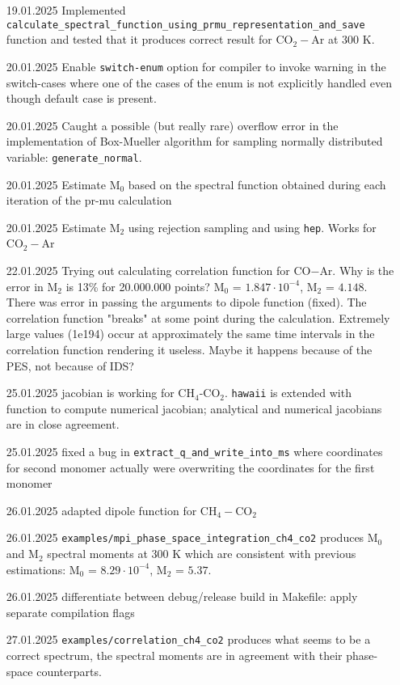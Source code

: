 \documentclass{article}
\begin{document}
\begin{enumerate}
    \item [19.01.2025] Implemented \texttt{calculate\_spectral\_function\_using\_prmu\_representation\_and\_save} function and tested that it produces correct result for CO$_2-$Ar at 300 K.
    \item [20.01.2025] Enable \texttt{switch-enum} option for compiler to invoke warning in the switch-cases where one of the cases of the enum is not explicitly handled even though default case is present. 
    \item [20.01.2025] Caught a possible (but really rare) overflow error in the implementation of Box-Mueller algorithm for sampling normally distributed variable: \texttt{generate\_normal}. 
    \item [20.01.2025] Estimate M$_0$ based on the spectral function obtained during each iteration of the pr-mu calculation
    \item [20.01.2025] Estimate M$_2$ using rejection sampling and using \texttt{hep}. Works for CO$_2-$Ar
    \item [22.01.2025] Trying out calculating correlation function for CO$-$Ar. Why is the error in M$_2$ is 13\% for 20.000.000 points? M$_0$ = $1.847 \cdot 10^{-4}$, M$_2$ = $4.148$. There was error in passing the arguments to dipole function (fixed). The correlation function "breaks" at some point during the calculation. Extremely large values (1e194) occur at approximately the same time intervals in the correlation function rendering it useless. Maybe it happens because of the PES, not because of IDS?  
    \item [25.01.2025] jacobian is working for CH$_4$-CO$_2$. \texttt{hawaii} is extended with function to compute numerical jacobian; analytical and numerical jacobians are in close agreement.
    \item [25.01.2025] fixed a bug in \texttt{extract\_q\_and\_write\_into\_ms} where coordinates for second monomer actually were overwriting the coordinates for the first monomer 
    \item [26.01.2025] adapted dipole function for CH$_4-$CO$_2$
    \item [26.01.2025] \texttt{examples/mpi\_phase\_space\_integration\_ch4\_co2} produces M$_0$ and M$_2$ spectral moments at 300 K which are consistent with previous estimations: M$_0$ =  $8.29 \cdot 10^{-4}$, M$_2$ = $5.37$. 
    \item [26.01.2025] differentiate between debug/release build in Makefile: apply separate compilation flags
    \item [27.01.2025] \texttt{examples/correlation\_ch4\_co2} produces what seems to be a correct spectrum, the spectral moments are in agreement with their phase-space counterparts.

\end{enumerate}
\end{document}
